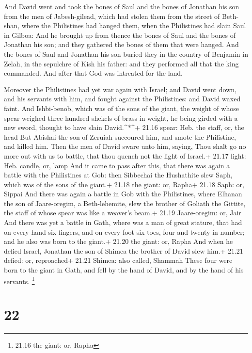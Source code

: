  And David went and took the bones of Saul and the bones of
Jonathan his son from the men of Jabesh-gilead, which had stolen them
from the street of Beth-shan, where the Philistines had hanged them,
when the Philistines had slain Saul in Gilboa:  And he
brought up from thence the bones of Saul and the bones of Jonathan his
son; and they gathered the bones of them that were hanged. 
And the bones of Saul and Jonathan his son buried they in the country of
Benjamin in Zelah, in the sepulchre of Kish his father: and they
performed all that the king commanded. And after that God was intreated
for the land.

 Moreover the Philistines had yet war again with Israel;
and David went down, and his servants with him, and fought against the
Philistines: and David waxed faint.  And Ishbi-benob, which
was of the sons of the giant, the weight of whose spear weighed three
hundred shekels of brass in weight, he being girded with a new sword,
thought to have slain David.\^{}*\^{}+ 21.16 spear: Heb. the staff, or,
the head  But Abishai the son of Zeruiah succoured him, and
smote the Philistine, and killed him. Then the men of David sware unto
him, saying, Thou shalt go no more out with us to battle, that thou
quench not the light of Israel.+ 21.17 light: Heb. candle, or, lamp
 And it came to pass after this, that there was again a
battle with the Philistines at Gob: then Sibbechai the Hushathite slew
Saph, which was of the sons of the giant.+ 21.18 the giant: or, Rapha+
21.18 Saph: or, Sippai  And there was again a battle in Gob
with the Philistines, where Elhanan the son of Jaare-oregim, a
Beth-lehemite, slew the brother of Goliath the Gittite, the staff of
whose spear was like a weaver's beam.+ 21.19 Jaare-oregim: or, Jair
 And there was yet a battle in Gath, where was a man of
great stature, that had on every hand six fingers, and on every foot six
toes, four and twenty in number; and he also was born to the giant.+
21.20 the giant: or, Rapha  And when he defied Israel,
Jonathan the son of Shimea the brother of David slew him.+ 21.21 defied:
or, reproached+ 21.21 Shimea: also called, Shammah  These
four were born to the giant in Gath, and fell by the hand of David, and
by the hand of his servants. \footnote{21.16 the giant: or, Rapha}

\hypertarget{section-21}{%
\section{22}\label{section-21}}

